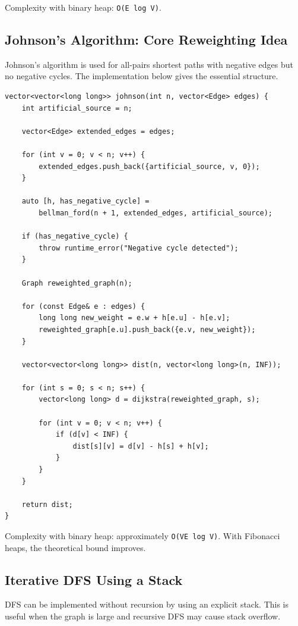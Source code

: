 \documentclass[11pt]{article}
\begin{document}
Complexity with binary heap: \texttt{O(E log V)}.

\subsection{Johnson's Algorithm: Core Reweighting Idea}

Johnson's algorithm is used for all-pairs shortest paths with negative edges but
no negative cycles. The implementation below gives the essential structure.

\begin{lstlisting}
vector<vector<long long>> johnson(int n, vector<Edge> edges) {
    int artificial_source = n;

    vector<Edge> extended_edges = edges;

    for (int v = 0; v < n; v++) {
        extended_edges.push_back({artificial_source, v, 0});
    }

    auto [h, has_negative_cycle] =
        bellman_ford(n + 1, extended_edges, artificial_source);

    if (has_negative_cycle) {
        throw runtime_error("Negative cycle detected");
    }

    Graph reweighted_graph(n);

    for (const Edge& e : edges) {
        long long new_weight = e.w + h[e.u] - h[e.v];
        reweighted_graph[e.u].push_back({e.v, new_weight});
    }

    vector<vector<long long>> dist(n, vector<long long>(n, INF));

    for (int s = 0; s < n; s++) {
        vector<long long> d = dijkstra(reweighted_graph, s);

        for (int v = 0; v < n; v++) {
            if (d[v] < INF) {
                dist[s][v] = d[v] - h[s] + h[v];
            }
        }
    }

    return dist;
}
\end{lstlisting}

Complexity with binary heap: approximately \texttt{O(VE log V)}.
With Fibonacci heaps, the theoretical bound improves.

\subsection{Iterative DFS Using a Stack}

DFS can be implemented without recursion by using an explicit stack. This is
useful when the graph is large and recursive DFS may cause stack overflow.
\end{document}
